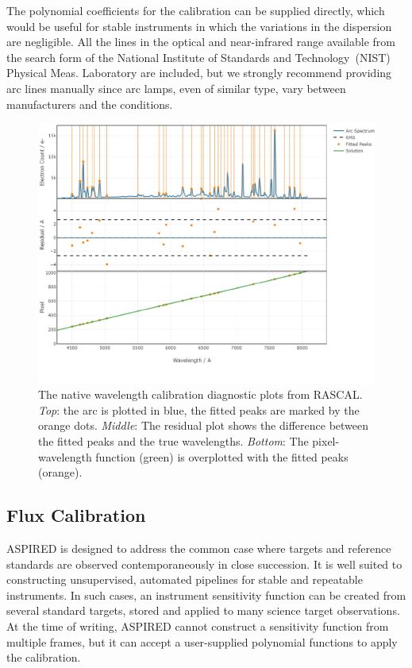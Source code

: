 \documentclass[linenumbers, twocolumn]{aastex631}
\begin{document}
The polynomial coefficients for the calibration can be supplied directly,
which would be useful for stable instruments in which the variations in the
dispersion are negligible. All the lines in the optical and near-infrared range
available from the search form of the National Institute of Standards and
Technology~(NIST) Physical Meas. Laboratory are included, but we strongly
recommend providing arc lines manually since arc lamps, even of similar type,
vary between manufacturers and the conditions.

\begin{figure}
    \centering
    \includegraphics[width=\columnwidth]{fig_05_wavelength_calibration_diagnostics.pdf}
    \caption{The native wavelength calibration diagnostic plots from RASCAL.
    \textit{Top}: the arc is plotted in blue, the fitted peaks are marked by
    the orange dots. \textit{Middle}: The residual plot shows the difference
    between the fitted peaks and the true wavelengths. \textit{Bottom}: The
    pixel-wavelength function (green) is overplotted with the fitted
    peaks (orange).}
    \label{fig:wavecal}
\end{figure}

\subsection{Flux Calibration}
\textsc{ASPIRED} is designed to address the common case where targets and
reference standards are observed contemporaneously in close succession. It is
well suited to constructing unsupervised, automated pipelines for stable and
repeatable instruments. In such cases, an instrument sensitivity function can be
created from several standard targets, stored and applied to many science target
observations. At the time of writing, \textsc{ASPIRED} cannot construct a
sensitivity function from multiple frames, but it can accept a user-supplied
polynomial functions to apply the calibration.
 
\end{document}
